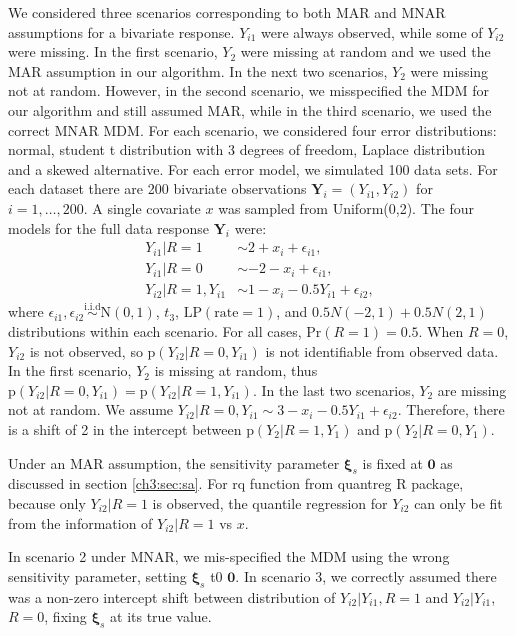 \documentclass[12pt]{article}
\newcommand{\iid}{\stackrel{\mbox{i.i.d}}{\sim}}
\newcommand{\pr}{\mbox{p}}
\newcommand{\prob}{\mbox{Pr}}
\begin{document}
We considered three scenarios corresponding to both MAR and MNAR assumptions for a bivariate response.
$Y_{i1}$ were always observed, while some of $Y_{i2}$ were missing.
In the first scenario, $Y_2$ were missing at random and we used the MAR assumption in our algorithm.
In the next two scenarios, $Y_2$ were missing not at random.
However, in the second scenario, we misspecified the MDM for our algorithm and still assumed MAR, while in the third scenario, we used the correct MNAR MDM.
For each scenario, we considered four error distributions: normal, student t distribution with 3 degrees of freedom, Laplace distribution and a skewed alternative.
For each error model, we simulated 100 data sets.
For each dataset there are 200 bivariate observations $\bm Y_i = (Y_{i1}, Y_{i2})$ for $i = 1, \ldots, 200$.
A single covariate $x$ was sampled from Uniform(0,2).
The four models for the full data response $\bm Y_i$ were:
\begin{align*}
  Y_{i1} | R = 1 & \sim 2 + x_i +  \epsilon_{i1} , \\
  Y_{i1}| R = 0 & \sim  -2 - x_i +  \epsilon_{i1} , \\
  Y_{i2}| R = 1, Y_{i1}&\sim 1 - x_i - 0.5Y_{i1} + \epsilon_{i2},
\end{align*}
where $\epsilon_{i1}, \epsilon_{i2} \iid \textrm{N}(0, 1)$, $t_3$,
$\mbox{LP}(\mbox{rate} = 1)$, and $0.5 N(-2, 1) + 0.5 N(2, 1)$ distributions within each scenario.
For all cases, $\prob (R = 1) = 0.5$.
When $R = 0$, $Y_{i2}$ is not observed, so $\pr(Y_{i2}| R = 0, Y_{i1})$ is not identifiable from observed data.
In the first scenario, $Y_2$ is missing at random, thus $\pr(Y_{i2} | R = 0, Y_{i1}) = \pr(Y_{i2}|R = 1, Y_{i1}) $.
In the last two scenarios, $Y_2$ are missing not at random.
We assume $Y_{i2}| R = 0, Y_{i1} \sim 3 - x_i - 0.5Y_{i1} + \epsilon_{i2}$.
Therefore, there is a shift of 2 in the intercept between $\pr(Y_2|R = 1, Y_1)$ and $\pr(Y_2|R = 0, Y_1)$.

Under an MAR assumption, the sensitivity parameter $\bm \xi_s$ is fixed at $\bm 0$ as discussed in section \ref{ch3:sec:sa}.
For rq function from quantreg R package, because only $Y_{i2}|R = 1$ is observed, the quantile regression for $Y_{i2}$ can only be fit from the information of $Y_{i2}|R = 1$ vs $x$.

In scenario 2 under MNAR, we mis-specified the MDM using the wrong sensitivity parameter, setting $\bm \xi_s$ t0 $\bm 0$.
In scenario 3, we correctly assumed there was a non-zero intercept shift between distribution of $Y_{i2}|Y_{i1}, R = 1$ and $Y_{i2}|Y_{i1}$, $R = 0$, fixing $\bm \xi_s$ at its true value.
\end{document}
